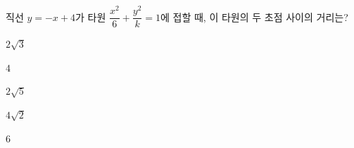 직선 $y=-x+4$가 타원 $\dfrac{x^2}{6}+\dfrac{y^2}{k}=1$에 접할 때, 이 타원의 두 초점 사이의 거리는? 
\begin{choices32}{\rule[-3ex]{0pt}{8ex}$2\sqrt{3}$}{\rule[-3ex]{0pt}{8ex}$4$}{\rule[-3ex]{0pt}{8ex}$2\sqrt{5}$}{\rule[-3ex]{0pt}{8ex}$4\sqrt{2}$}{\rule[-3ex]{0pt}{8ex}$6$}\end{choices32}
